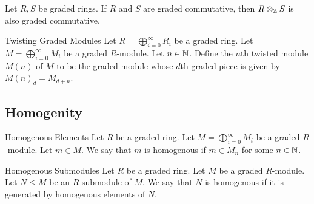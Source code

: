 \documentclass[a4paper]{article}
\begin{document}
\begin{lmm}{}{} Let $R,S$ be graded rings. If $R$ and $S$ are graded commutative, then $R\otimes_{\mathbb{Z}} S$ is also graded commutative. 
\end{lmm}

\begin{defn}{Twisting Graded Modules}{} Let $R=\bigoplus_{i=0}^\infty R_i$ be a graded ring. Let $M=\bigoplus_{i=0}^\infty M_i$ be a graded $R$-module. Let $n\in\mathbb{N}$. Define the $n$th twisted module $M(n)$ of $M$ to be the graded module whose $d$th graded piece is given by $M(n)_d=M_{d+n}$. 
\end{defn}

\subsection{Homogenity}
\begin{defn}{Homogenous Elements}{} Let $R$ be a graded ring. Let $M=\bigoplus_{i=0}^\infty M_i$ be a graded $R$-module. Let $m\in M$. We say that $m$ is homogenous if $m\in M_n$ for some $n\in\mathbb{N}$. 
\end{defn}

\begin{defn}{Homogenous Submodules}{} Let $R$ be a graded ring. Let $M$ be a graded $R$-module. Let $N\leq M$ be an $R$-submodule of $M$. We say that $N$ is homogenous if it is generated by homogenous elements of $N$. 
\end{defn}
\end{document}

